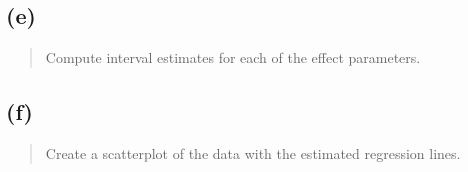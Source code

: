 \documentclass[
]{article}
\begin{document}
\vspace{50pt}

\hypertarget{e-2}{%
\subsection{(e)}\label{e-2}}

\begin{quote}
Compute interval estimates for each of the effect parameters.
\end{quote}

\vspace{50pt}

\hypertarget{f-2}{%
\subsection{(f)}\label{f-2}}

\begin{quote}
Create a scatterplot of the data with the estimated regression lines.
\end{quote}
\end{document}
